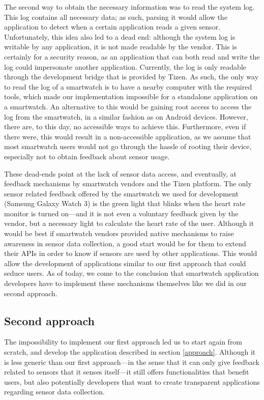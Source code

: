 \documentclass[conference, a4paper, 10pt, twocolumn]{IEEEtran}
\begin{document}
The second way to obtain the necessary information was to read the system log. This log contains all necessary data; as such, parsing it would allow the application to detect when a certain application reads a given sensor. Unfortunately, this idea also led to a dead end: although the system log is writable by any application, it is not made readable by the vendor. This is certainly for a security reason, as an application that can both read and write the log could impersonate another application. Currently, the log is only readable through the development bridge that is provided by Tizen. As such, the only way to read the log of a smartwatch is to have a nearby computer with the required tools, which made our implementation impossible for a standalone application on a smartwatch. An alternative to this would be gaining root access to access the log from the smartwatch, in a similar fashion as on Android devices. However, there are, to this day, no accessible ways to achieve this. Furthermore, even if there were, this would result in a non-accessible application, as we assume that most smartwatch users would not go through the hassle of rooting their device, especially not to obtain feedback about sensor usage. 

These dead-ends point at the lack of sensor data access, and eventually, at feedback mechanisms by smartwatch vendors and the Tizen platform. The only sensor related feedback offered by the smartwatch we used for development (Samsung Galaxy Watch 3) is the green light that blinks when the heart rate monitor is turned on---and it is not even a voluntary feedback given by the vendor, but a necessary light to calculate the heart rate of the user. Although it would be best if smartwatch vendors provided native mechanisms to raise awareness in sensor data collection, a good start would be for them to extend their \acp{API} in order to know if sensors are used by other applications. This would allow the development of applications similar to our first approach that could seduce users. As of today, we come to the conclusion that smartwatch application developers have to implement these mechanisms themselves like we did in our second approach.

\subsection{\textbf{Second approach}}
The impossibility to implement our first approach led us to start again from scratch, and develop the application described in section \ref{approach}. Although it is less generic than our first approach---in the sense that it can only give feedback related to sensors that it senses itself---it still offers functionalities that benefit users, but also potentially developers that want to create transparent applications regarding sensor data collection.
\end{document}

